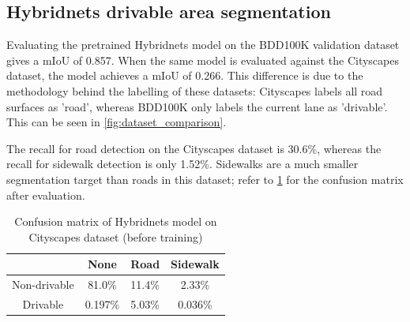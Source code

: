 \pagebreak
\subsection{Hybridnets drivable area segmentation}
Evaluating the pretrained Hybridnets model on the BDD100K validation dataset gives a mIoU
of 0.857. When the same model is evaluated against the Cityscapes dataset,
the model achieves a mIoU of 0.266. This difference is due to the methodology behind
the labelling of these datasets: Cityscapes labels all road surfaces as 'road',
whereas BDD100K only labels the current lane as 'drivable'. This can be seen in \cref{fig:dataset_comparison}.

The recall for road detection on the Cityscapes dataset is 30.6\%, whereas the recall for
sidewalk detection is only 1.52\%. Sidewalks are a much smaller segmentation target than
roads in this dataset; refer to \cref{table:pretrained_confusion_matrix} for the
confusion matrix after evaluation.

\begin{table}[H]
    \centering
    \begin{tabular}{|c|c|c|c|}
    \hline
    & None & Road & Sidewalk \\
    \hline
    Non-drivable & 81.0\% & 11.4\% & 2.33\% \\
    \hline
    Drivable & 0.197\% & 5.03\% & 0.036\% \\
    \hline
    \end{tabular}
    \caption{Confusion matrix of Hybridnets model on Cityscapes dataset (before training)}
    \label{table:pretrained_confusion_matrix}
\end{table}

